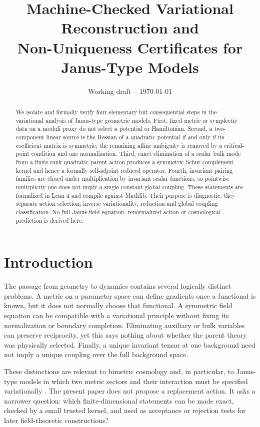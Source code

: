 \documentclass[11pt,a4paper]{article}
\title{Machine-Checked Variational Reconstruction and\\
Non-Uniqueness Certificates for Janus-Type Models}
\author{}
\date{Working draft -- \today}
\theoremstyle{definition}
\theoremstyle{remark}
\begin{document}
\maketitle

\begin{abstract}
We isolate and formally verify four elementary but consequential steps in the
variational analysis of Janus-type geometric models. First, fixed metric or
symplectic data on a moduli proxy do not select a potential or Hamiltonian.
Second, a two-component linear source is the Hessian of a quadratic potential
if and only if its coefficient matrix is symmetric; the remaining affine
ambiguity is removed by a critical-point condition and one normalization.
Third, exact elimination of a scalar bulk mode from a finite-rank quadratic
parent action produces a symmetric Schur-complement kernel and hence a
formally self-adjoint reduced operator. Fourth, invariant pairing families are
closed under multiplication by invariant scalar functions, so pointwise
multiplicity one does not imply a single constant global coupling. These
statements are formalized in Lean 4 and compile against Mathlib. Their purpose
is diagnostic: they separate action selection, inverse variationality,
reduction and global coupling classification. No full Janus field equation,
renormalized action or cosmological prediction is derived here.
\end{abstract}

\section{Introduction}

The passage from geometry to dynamics contains several logically distinct
problems. A metric on a parameter space can define gradients once a functional
is known, but it does not normally choose that functional. A symmetric field
equation can be compatible with a variational principle without fixing its
normalization or boundary completion. Eliminating auxiliary or bulk variables
can preserve reciprocity, yet this says nothing about whether the parent
theory was physically selected. Finally, a unique invariant tensor at one
background need not imply a unique coupling over the full background space.

These distinctions are relevant to bimetric cosmology and, in particular, to
Janus-type models in which two metric sectors and their interaction must be
specified variationally \cite{PetitDAgostini2015,PetitMargnatZejli2024}. The
present paper does not propose a replacement action. It asks a narrower
question: which finite-dimensional statements can be made exact, checked by a
small trusted kernel, and used as acceptance or rejection tests for later
field-theoretic constructions?
\end{document}
